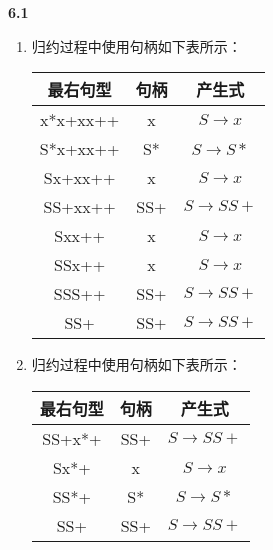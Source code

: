 \documentclass[UTF8]{report}
\newcommand{\tbf}[1]{\textbf{#1}}
\begin{document}
\pagestyle{fancy}

\maketitle

\noindent
\tbf{6.1}

\begin{enumerate}[label=(\arabic*)]
    \item 归约过程中使用句柄如下表所示：
    \begin{table}[H]
        \centering
        \begin{tabular}{|c|c|c|}
            \hline
            最右句型 & 句柄 & 产生式 \\
            \hline
            x*x+xx++ & x & $S \to x$ \\
            S*x+xx++ & S* & $S \to S*$ \\
            Sx+xx++ & x & $S \to x$ \\
            SS+xx++ & SS+ & $S \to SS+$ \\
            Sxx++ & x & $S \to x$ \\
            SSx++ & x & $S \to x$ \\
            SSS++ & SS+ & $S \to SS+$ \\
            SS+ & SS+ & $S \to SS+$ \\
            \hline
        \end{tabular}
    \end{table}
    \item 归约过程中使用句柄如下表所示：
    \begin{table}[H]
        \centering
        \begin{tabular}{|c|c|c|}
            \hline
            最右句型 & 句柄 & 产生式 \\
            \hline
            SS+x*+ & SS+ & $S \to SS+$ \\
            Sx*+ & x & $S \to x$ \\
            SS*+ & S* & $S \to S*$ \\
            SS+ & SS+ & $S \to SS+$ \\
            \hline
        \end{tabular}

\end{table}
\end{enumerate}
\end{document}
